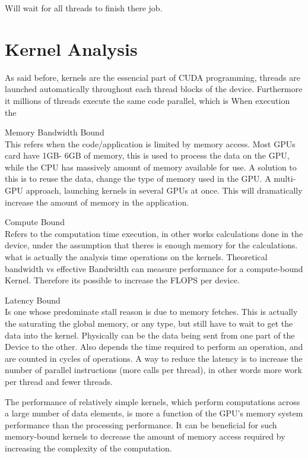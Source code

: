 Will wait for all threads to finish there job.

\section{Kernel Analysis}

As said before, kernels are the essencial part of CUDA programming, threads are launched automatically throughout each thread blocks of the device. Furthermore it millions of threads execute the same code parallel, which is  When execution the 


\begin{description}

 \item{Memory Bandwidth Bound} \hfill \\
 This refers when the code/application is limited by memory access. Most GPUs card have 1GB- 6GB of memory, this is used to process the data on the GPU, while the CPU has massively amount of memory available for use. A solution to this is to reuse the data, change the type of memory used in the GPU. A multi-GPU approach, launching kernels in several GPUs at once. This will dramatically increase the amount of memory in the application.

  \item{Compute Bound} \hfill \\
Refers to the computation time execution, in other works calculations done in the device, under the assumption that  theres is enough memory for the calculations. what is actually the analysis time operations on the kernels. Theoretical bandwidth vs  effective Bandwidth can measure performance for a compute-bound Kernel. Therefore its possible to increase the FLOPS per device.

 \item{Latency Bound} \hfill \\
 Is one whose predominate stall reason is due to memory fetches. This is actually the saturating the global memory, or any type, but still have to wait to get the data into the kernel. Physically can be the data being sent from one part of the Device to the other. Also depends the time required to perform an operation, and are counted in cycles of operations. A way to reduce the latency is to increase the number of parallel instructions (more  calls per thread), in other words more work per thread and fewer threads.
 \end{description}

The performance of relatively simple kernels, which perform computations across a large number of data elements, is more a function of the GPU's memory system performance than the processing performance. It can be beneficial for such memory-bound kernels to decrease the amount of memory access required by increasing the complexity of the computation. \cite{cook}


